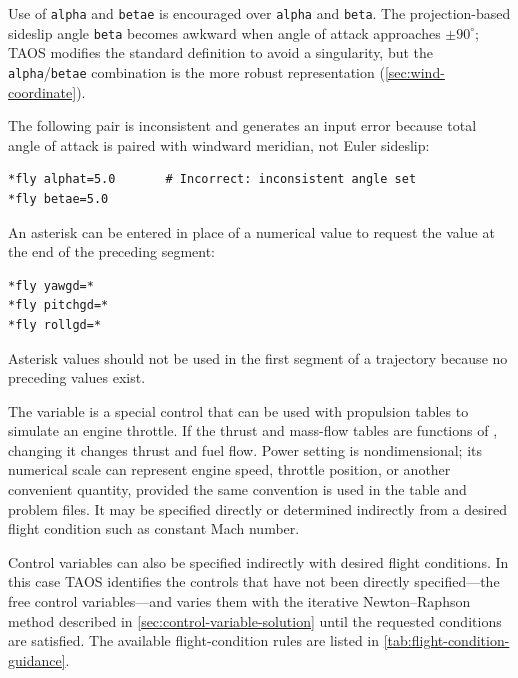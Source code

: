 Use of \texttt{alpha} and \texttt{betae} is encouraged over \texttt{alpha} and
\texttt{beta}. The projection-based sideslip angle \texttt{beta} becomes awkward
when angle of attack approaches $\pm90^\circ$; TAOS modifies the standard
definition to avoid a singularity, but the \texttt{alpha}/\texttt{betae} combination
is the more robust representation (\cref{sec:wind-coordinate}).

The following pair is inconsistent and generates an input error because total angle
of attack is paired with windward meridian, not Euler sideslip:

\begin{lstlisting}[style=taosmanual]
*fly alphat=5.0       # Incorrect: inconsistent angle set
*fly betae=5.0
\end{lstlisting}


An asterisk can be entered in place of a numerical value to request the value at the
end of the preceding segment:

\begin{lstlisting}[style=taosmanual]
*fly yawgd=*
*fly pitchgd=*
*fly rollgd=*
\end{lstlisting}

Asterisk values should not be used in the first segment of a trajectory because no
preceding values exist.


The  variable is a special control that can be used with propulsion
tables to simulate an engine throttle. If the thrust and mass-flow tables are functions
of , changing it changes thrust and fuel flow. Power setting is
nondimensional; its numerical scale can represent engine speed, throttle position, or
another convenient quantity, provided the same convention is used in the table and
problem files. It may be specified directly or determined indirectly from a desired
flight condition such as constant Mach number.


Control variables can also be specified indirectly with desired flight conditions. In
this case TAOS identifies the controls that have not been directly specified---the
free control variables---and varies them with the iterative Newton--Raphson method
described in \cref{sec:control-variable-solution} until the requested conditions are
satisfied. The available flight-condition rules are listed in
\cref{tab:flight-condition-guidance}.

